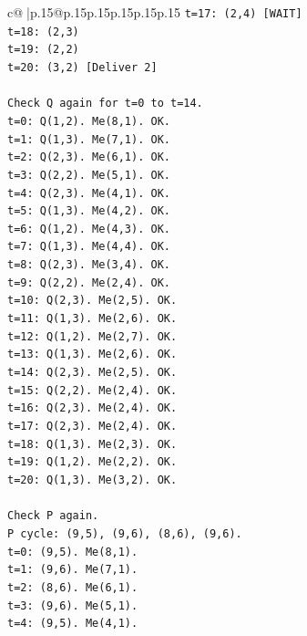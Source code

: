 \documentclass{article}
\begin{document}
{\begin{supertabular}{c@{$\;$}|p{.15\linewidth}@{}p{.15\linewidth}p{.15\linewidth}p{.15\linewidth}p{.15\linewidth}p{.15\linewidth}}
{{{\texttt{t=17: (2,4) {[}WAIT{]}} \\
\texttt{t=18: (2,3)} \\
\texttt{t=19: (2,2)} \\
\texttt{t=20: (3,2) {[}Deliver 2{]}} \\
\\ 
\texttt{Check Q again for t=0 to t=14.} \\
\texttt{t=0: Q(1,2). Me(8,1). OK.} \\
\texttt{t=1: Q(1,3). Me(7,1). OK.} \\
\texttt{t=2: Q(2,3). Me(6,1). OK.} \\
\texttt{t=3: Q(2,2). Me(5,1). OK.} \\
\texttt{t=4: Q(2,3). Me(4,1). OK.} \\
\texttt{t=5: Q(1,3). Me(4,2). OK.} \\
\texttt{t=6: Q(1,2). Me(4,3). OK.} \\
\texttt{t=7: Q(1,3). Me(4,4). OK.} \\
\texttt{t=8: Q(2,3). Me(3,4). OK.} \\
\texttt{t=9: Q(2,2). Me(2,4). OK.} \\
\texttt{t=10: Q(2,3). Me(2,5). OK.} \\
\texttt{t=11: Q(1,3). Me(2,6). OK.} \\
\texttt{t=12: Q(1,2). Me(2,7). OK.} \\
\texttt{t=13: Q(1,3). Me(2,6). OK.} \\
\texttt{t=14: Q(2,3). Me(2,5). OK.} \\
\texttt{t=15: Q(2,2). Me(2,4). OK.} \\
\texttt{t=16: Q(2,3). Me(2,4). OK.} \\
\texttt{t=17: Q(2,3). Me(2,4). OK.} \\
\texttt{t=18: Q(1,3). Me(2,3). OK.} \\
\texttt{t=19: Q(1,2). Me(2,2). OK.} \\
\texttt{t=20: Q(1,3). Me(3,2). OK.} \\
\\ 
\texttt{Check P again.} \\
\texttt{P cycle: (9,5), (9,6), (8,6), (9,6).} \\
\texttt{t=0: (9,5). Me(8,1).} \\
\texttt{t=1: (9,6). Me(7,1).} \\
\texttt{t=2: (8,6). Me(6,1).} \\
\texttt{t=3: (9,6). Me(5,1).} \\
\texttt{t=4: (9,5). Me(4,1).} \\
}}}
\end{supertabular}}
\end{document}
